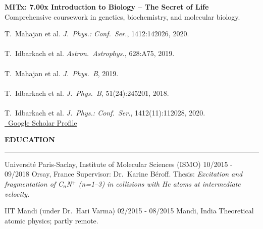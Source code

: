 \documentclass{thejus_cv}
\begin{document}
\begin{paracol}{2}
\textbf{MITx: 7.00x Introduction to Biology -- The Secret of Life}\\
{\small Comprehensive coursework in genetics, biochemistry, and molecular biology.}\\[0.4cm]


{\small
T.~Mahajan et al. \textit{J.~Phys.: Conf.~Ser.}, 1412:142026, 2020.\\[0.15cm]
{\color{cvlightgray}\hdashrule{\linewidth}{0.5pt}{1mm}}\\[0.15cm]
T.~Idbarkach et al. \textit{Astron.~Astrophys.}, 628:A75, 2019.\\[0.15cm]
{\color{cvlightgray}\hdashrule{\linewidth}{0.5pt}{1mm}}\\[0.15cm]
T.~Mahajan et al. \textit{J.~Phys.~B}, 2019.\\[0.15cm]
{\color{cvlightgray}\hdashrule{\linewidth}{0.5pt}{1mm}}\\[0.15cm]
T.~Idbarkach et al. \textit{J.~Phys.~B}, 51(24):245201, 2018.\\[0.15cm]
{\color{cvlightgray}\hdashrule{\linewidth}{0.5pt}{1mm}}\\[0.15cm]
T.~Idbarkach et al. \textit{J.~Phys.: Conf.~Ser.}, 1412(11):112028, 2020.
}\\[0.1cm]
\href{https://scholar.google.com/citations?user=PJkZwAwAAAAJ}{\faGraduationCap\ Google Scholar Profile}



\end{paracol}

\begin{center}
    \vspace{0.1em}
    {\Large\textbf{EDUCATION}}\\
    {\color{cvtext}\rule{0.5\linewidth}{1.5pt}}\par
    \vspace{0.3em}
\end{center}

\begin{minipage}[t]{0.48\textwidth}
             {Universit\'e Paris-Saclay, Institute of Molecular Sciences (ISMO)}
             {10/2015 - 09/2018}
             {Orsay, France}
             {{\small Supervisor: Dr.~Karine B\'eroff. Thesis: \textit{Excitation and fragmentation of C$_n$N$^+$ (n=1--3) in collisions with He atoms at intermediate velocity.}}}
\end{minipage}%
\hfill
\begin{minipage}[t]{0.48\textwidth}
             {IIT Mandi (under Dr.~Hari Varma)}
             {02/2015 - 08/2015}
             {Mandi, India}
             {{\small Theoretical atomic physics; partly remote.}}
\end{minipage}
\end{document}

